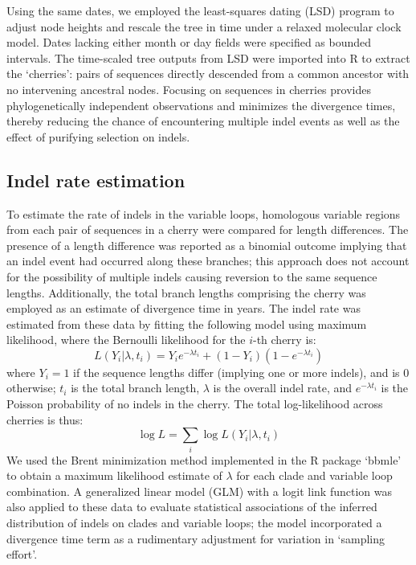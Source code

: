 \documentclass[12pt]{article}
\begin{document}
Using the same dates, we employed the least-squares dating (LSD) program \citep{To:2015} to adjust node heights and rescale the tree in time under a relaxed molecular clock model. 
Dates lacking either month or day fields were specified as bounded intervals. 
The time-scaled tree outputs from LSD were imported into R to extract the `cherries': pairs of sequences directly descended from a common ancestor with no intervening ancestral nodes. 
Focusing on sequences in cherries provides phylogenetically independent observations and minimizes the divergence times, thereby reducing the chance of encountering multiple indel events as well as the effect of purifying selection on indels.


\subsection * {Indel rate estimation}

To estimate the rate of indels in the variable loops, homologous variable regions from each pair of sequences in a cherry were compared for length differences. 
The presence of a length difference was reported as a binomial outcome implying that an indel event had occurred along these branches; this approach does not account for the possibility of multiple indels causing reversion to the same sequence lengths.  
Additionally, the total branch lengths comprising the cherry was employed as an estimate of divergence time in years.  
The indel rate was estimated from these data by fitting the following model using maximum likelihood, where the Bernoulli likelihood for the $i$-th cherry is: 
\[%
L(Y_i | \lambda, t_i) = Y_i e^{-\lambda t_i} + (1-Y_i) (1-e^{-\lambda t_i})
\]%
where $Y_i=1$ if the sequence lengths differ (implying one or more indels), and is $0$ otherwise; $t_i$ is the total branch length, $\lambda$ is the overall indel rate, and $e^{-\lambda t_i}$ is the Poisson probability of no indels in the cherry.
The total log-likelihood across cherries is thus:
\[%
\log L = \sum_{i} \log L(Y_i | \lambda, t_i)
\]%
We used the Brent minimization method implemented in the R package `bbmle' to obtain a maximum likelihood estimate of $\lambda$ for each clade and variable loop combination.
A generalized linear model (GLM) with a logit link function was also applied to these data to evaluate statistical associations of the inferred distribution of indels on clades and variable loops; the model incorporated a divergence time term as a rudimentary adjustment for variation in `sampling effort'. 
\end{document}
